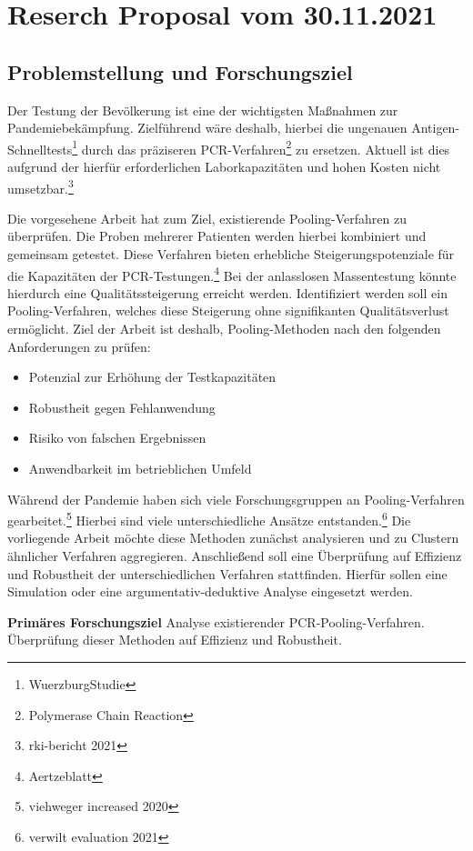 
\chapter{Reserch Proposal vom 30.11.2021}
\section{Problemstellung und Forschungsziel}
Der Testung der Bevölkerung ist eine der wichtigsten Maßnahmen zur Pandemiebekämpfung.
Zielführend wäre deshalb, hierbei die ungenauen Antigen-Schnelltests\footnote{WuerzburgStudie}
durch das präziseren PCR-Verfahren\footnote{Polymerase Chain Reaction}
zu ersetzen.
Aktuell ist dies aufgrund der hierfür erforderlichen Laborkapazitäten und hohen Kosten nicht umsetzbar.\footnote{rki-bericht 2021}

Die vorgesehene Arbeit hat zum Ziel, existierende Pooling-Verfahren zu überprüfen.
Die Proben mehrerer Patienten werden hierbei kombiniert und gemeinsam getestet.
Diese Verfahren bieten erhebliche Steigerungspotenziale für die Kapazitäten der PCR-Testungen.\footnote{Aertzeblatt}
Bei der anlasslosen Massentestung könnte hierdurch eine Qualitätssteigerung erreicht werden.
Identifiziert werden soll ein Pooling-Verfahren, welches diese Steigerung ohne signifikanten Qualitätsverlust ermöglicht.
Ziel der Arbeit ist deshalb, Pooling-Methoden nach den folgenden Anforderungen zu prüfen:
\begin{itemize}
	\setlength{\itemsep}{-8pt}
	\item Potenzial zur Erhöhung der Testkapazitäten
	\item Robustheit gegen Fehlanwendung
	\item Risiko von falschen Ergebnissen
	\item Anwendbarkeit im betrieblichen Umfeld
\end{itemize}

Während der Pandemie haben sich viele Forschungsgruppen an Pooling-Verfahren gearbeitet.\footnote{viehweger increased 2020}
Hierbei sind viele unterschiedliche Ansätze entstanden.\footnote{verwilt evaluation 2021}
Die vorliegende Arbeit möchte diese Methoden zunächst analysieren und zu Clustern ähnlicher Verfahren aggregieren.
Anschließend soll  eine Überprüfung auf Effizienz und Robustheit der unterschiedlichen Verfahren stattfinden.
Hierfür sollen eine Simulation oder eine argumentativ-deduktive Analyse eingesetzt werden.

\textbf{Primäres Forschungsziel}\newline
Analyse existierender PCR-Pooling-Verfahren.\newline
Überprüfung dieser Methoden auf Effizienz und Robustheit.

